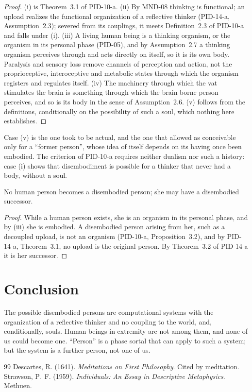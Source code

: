 \documentclass{situationist-preprint}
\begin{document}
\begin{proof}
(i) is Theorem~3.1 of PID-10-a. (ii) By MND-08 thinking is functional; an upload realizes the functional organization of a reflective thinker (PID-14-a, Assumption~2.3); severed from its couplings, it meets Definition~2.3 of PID-10-a and falls under (i). (iii) A living human being is a thinking organism, or the organism in its personal phase (PID-05), and by Assumption~2.7 a thinking organism perceives through and acts directly on itself, so it is its own body. Paralysis and sensory loss remove channels of perception and action, not the proprioceptive, interoceptive and metabolic states through which the organism registers and regulates itself. (iv) The machinery through which the vat stimulates the brain is something through which the brain-borne person perceives, and so is its body in the sense of Assumption~2.6. (v) follows from the definitions, conditionally on the possibility of such a soul, which nothing here establishes.
\end{proof}

Case (v) is the one \citet[VI]{Descartes1641} took to be actual, and the one that \citet[ch.~3]{Strawson1959} allowed as conceivable only for a \enquote{former person}, whose idea of itself depends on its having once been embodied. The criterion of PID-10-a requires neither dualism nor such a history: case (i) shows that disembodiment is possible for a thinker that never had a body, without a soul.

\begin{corollary}\label{c:human}
No human person becomes a disembodied person; she may have a disembodied successor.
\end{corollary}

\begin{proof}
While a human person exists, she is an organism in its personal phase, and by (iii) she is embodied. A disembodied person arising from her, such as a decoupled upload, is not an organism (PID-10-a, Proposition~3.2), and by PID-14-a, Theorem~3.1, no upload is the original person. By Theorem~3.2 of PID-14-a it is her successor.
\end{proof}

\section{Conclusion}

The possible disembodied persons are computational systems with the organization of a reflective thinker and no coupling to the world, and, conditionally, souls. Human beings in extremity are not among them, and none of us could become one. \enquote{Person} is a phase sortal that can apply to such a system; but the system is a further person, not one of us.

\begin{thebibliography}{99}\small
{} Descartes, R. (1641). \emph{Meditations on First Philosophy}. Cited by meditation.
 Strawson, P.~F. (1959). \emph{Individuals: An Essay in Descriptive Metaphysics}. Methuen.
\end{thebibliography}
\end{document}
